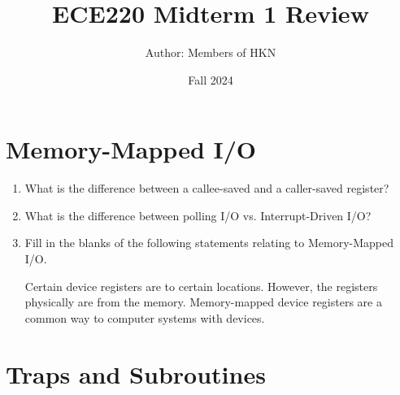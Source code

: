 \documentclass{article}
\title{ECE220 Midterm 1 Review}
\author{Author: Members of HKN}
\date{Fall 2024}
\newcommand{\wideunderscore}{\underline{\hphantom{n}}}
\begin{document}
\maketitle

\section {
Memory-Mapped I/O
}


\begin{enumerate}[label=(\alph*)]
    \item What is the difference between a callee-saved and a caller-saved register?
    \newline
    \newline
    \newline
    \newline
    \newline
   

    \item What is the difference between polling I/O vs. Interrupt-Driven I/O?
    \newline
    \newline
    \newline
    \newline
    \newline

    \item Fill in the blanks of the following statements relating to Memory-Mapped I/O.

    Certain device registers are \wideunderscore\wideunderscore\wideunderscore\wideunderscore\wideunderscore\wideunderscore\wideunderscore\wideunderscore to certain \wideunderscore\wideunderscore\wideunderscore\wideunderscore\wideunderscore\wideunderscore\wideunderscore\wideunderscore locations. However, the registers physically are \wideunderscore\wideunderscore\wideunderscore\wideunderscore\wideunderscore\wideunderscore\wideunderscore\wideunderscore from the memory. Memory-mapped device registers are a common way to \wideunderscore\wideunderscore\wideunderscore\wideunderscore\wideunderscore\wideunderscore\wideunderscore\wideunderscore computer systems with devices.

    

    
\end{enumerate}


\section{
    Traps and Subroutines
}
\end{document}
